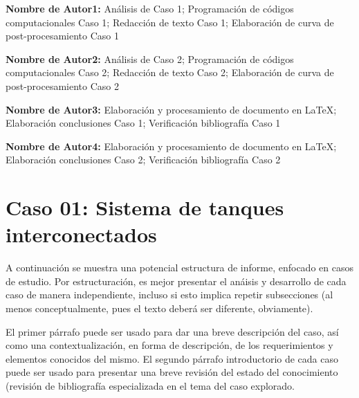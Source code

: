 \documentclass[11pt,stdletter,orderfromtodate,sigleft,twoside]{report}
\begin{document}
\begin{framed}
    {\large \textbf{Nombre de Autor1:} An\'alisis de Caso 1; Programaci\'on de c\'odigos computacionales Caso 1; Redacci\'on de texto Caso 1; Elaboraci\'on de curva de post-procesamiento Caso 1}\\[2mm]
\end{framed}
\begin{framed}
    {\large \textbf{Nombre de Autor2:} An\'alisis de Caso 2; Programaci\'on de c\'odigos computacionales Caso 2; Redacci\'on de texto Caso 2; Elaboraci\'on de curva de post-procesamiento Caso 2}\\[2mm]
\end{framed}
\begin{framed}
    {\large \textbf{Nombre de Autor3:} Elaboraci\'on y procesamiento de documento en \LaTeX ; Elaboraci\'on conclusiones Caso 1; Verificaci\'on bibliograf\'ia Caso 1}\\[2mm]
\end{framed}
\begin{framed}
    {\large \textbf{Nombre de Autor4:} Elaboraci\'on y procesamiento de documento en \LaTeX ; Elaboraci\'on conclusiones Caso 2; Verificaci\'on bibliograf\'ia Caso 2}\\[2mm]
\end{framed}

\newpage



\section{Caso 01: Sistema de tanques interconectados}
A continuaci\'on se muestra una potencial estructura de informe, enfocado en
casos de estudio. Por estructuraci\'on, es mejor presentar el an\'aisis y
desarrollo de cada caso de manera independiente, incluso si esto implica
repetir subsecciones (al menos conceptualmente, pues el texto deber\'a ser
diferente, obviamente).
\medskip 

El primer p\'arrafo puede ser usado para dar una breve descripci\'on del caso,
as\'i como una contextualizaci\'on, en forma de descripci\'on, de los
requerimientos y elementos conocidos del mismo. El segundo p\'arrafo
introductorio de cada caso puede ser usado para presentar una breve revisi\'on
del estado del conocimiento (revisi\'on de bibliograf\'ia especializada en el
tema del caso explorado.
\medskip
\end{document}
